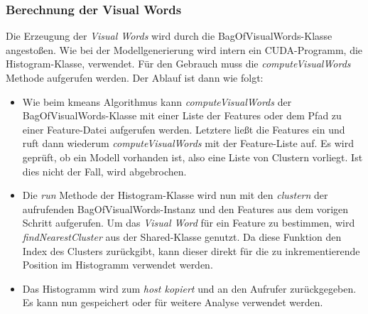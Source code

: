 \subsubsection{Berechnung der Visual Words}

Die Erzeugung der \textit{Visual Words} wird durch die BagOfVisualWords-Klasse angestoßen. Wie bei der Modellgenerierung wird intern ein CUDA-Programm, die Histogram-Klasse, verwendet. Für den Gebrauch muss die \textit{computeVisualWords} Methode aufgerufen werden. Der Ablauf ist dann wie folgt:

\begin{itemize}
	\item Wie beim kmeans Algorithmus kann \textit{computeVisualWords} der BagOfVisualWords-Klasse mit einer Liste der Features oder dem Pfad zu einer Feature-Datei aufgerufen werden. Letztere ließt die Features ein und ruft dann wiederum \textit{computeVisualWords} mit der Feature-Liste auf. Es wird geprüft, ob ein Modell vorhanden ist, also eine Liste von Clustern vorliegt. Ist dies nicht der Fall, wird abgebrochen.
	\item Die \textit{run} Methode der Histogram-Klasse wird nun mit den \textit{clustern} der aufrufenden BagOfVisualWords-Instanz und den Features aus dem vorigen Schritt aufgerufen. Um das \textit{Visual Word} für ein Feature zu bestimmen, wird \textit{findNearestCluster} aus der Shared-Klasse genutzt. Da diese Funktion den Index des Clusters zurückgibt, kann dieser direkt für die zu inkrementierende Position im Histogramm verwendet werden.
	\item Das Histogramm wird zum \textit{host kopiert} und an den Aufrufer zurückgegeben. Es kann nun gespeichert oder für weitere Analyse verwendet werden.
\end{itemize}